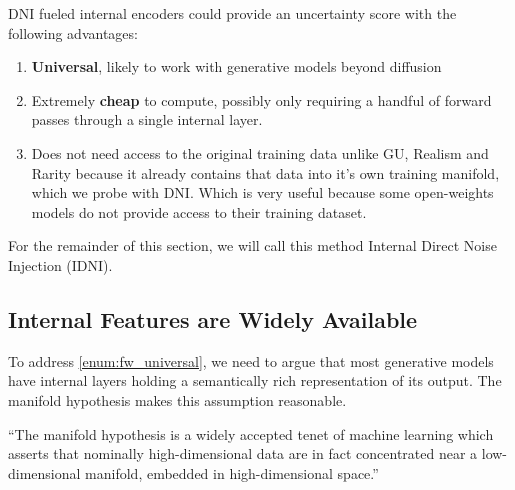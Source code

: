 \acs{DNI} fueled internal encoders could provide an uncertainty score with the following advantages:
\begin{enumerate}
    \item \textbf{Universal}, likely to work with generative models beyond diffusion \label{enum:fw_universal}
    \item Extremely \textbf{cheap} to compute, possibly only requiring a handful of forward passes through a single internal layer. \label{enum:fw_cheap}
    \item Does not need access to the original training data unlike \acs{GU}, Realism and Rarity because it already contains that data into it's own training manifold, which we probe with \acs{DNI}. Which is very useful because some open-weights models do not provide access to their training dataset.
\end{enumerate}  

For the remainder of this section, we will call this method Internal Direct Noise Injection (\acs{IDNI}).


\subsection{Internal Features are Widely Available}
To address \autoref{enum:fw_universal}, we need to argue that most generative models have internal layers holding a semantically rich representation of its output. The manifold hypothesis \parencite{whiteley_statistical_2026} makes this assumption reasonable.

\begin{tcolorbox}[colback=gray!10!white,colframe=gray!50!black,sharp corners]
``The manifold hypothesis is a widely accepted tenet of machine learning which asserts that nominally high-dimensional data are in fact concentrated near a low-dimensional manifold, embedded in high-dimensional space.'' \parencite{whiteley_statistical_2026}
\end{tcolorbox}

